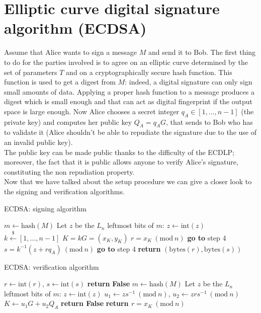 \bigskip

\section{Elliptic curve digital signature algorithm (ECDSA)}
\label{ecdsa}
Assume that Alice wants to sign a message $M$ and send it to Bob. The first thing to do for the parties involved is to agree on an elliptic curve determined by the set of parameters $T$ and on a cryptographically secure hash function. This function is used to get a digest from $M$: indeed, a digital signature can only sign small amounts of data. Applying a proper hash function to a message produces a digest which is small enough and that can act as digital fingerprint if the output space is large enough. Now Alice chooses a secret integer $q_A \in [1, ..., n - 1]$ (the private key) and computes her public key $Q_A = q_AG$, that sends to Bob who has to validate it (Alice shouldn't be able to repudiate the signature due to the use of an invalid public key). 
\\
The public key can be made public thanks to the difficulty of the ECDLP; moreover, the fact that it is public allows anyone to verify Alice's signature, constituting the non repudiation property.
\\
Now that we have talked about the setup procedure we can give a closer look to the signing and verification algorithms.

\bigskip

\begin{algorithm}
	\caption{ECDSA: signing algorithm}
	\label{alg:ecdsa_sig}
	\begin{algorithmic}[1]
		\State $m \gets \text{hash}(M)$
		\State Let $z$ be the $L_n$ leftmost bits of $m$: $z \gets \text{int}(z)$
		\State $k \xleftarrow{\text{\$}} [1, ..., n - 1]$
		\State $K = kG = (x_K, y_K)$
		\State $r = x_K \ (\text{mod} \ n)$
		\State \textbf{go to} step 4
		\EndIf 
		\State $s = k^{-1}(z + rq_A) \ (\text{mod} \ n)$
		\State \textbf{go to} step 4
		\EndIf
		\State \textbf{return} $(\text{bytes}(r), \text{bytes}(s))$
		\EndProcedure
	\end{algorithmic}
\end{algorithm}

\bigskip

\begin{algorithm}
	\caption{ECDSA: verification algorithm}
	\label{alg:ecdsa_ver}
	\begin{algorithmic}[1]
		\State $r \gets \text{int}(r)$, $s \gets \text{int}(s)$
		\State \textbf{return} {\bf False}
		\EndIf
		\State $m \gets \text{hash}(M)$
		\State Let $z$ be the $L_n$ leftmost bits of $m$: $z \gets \text{int}(z)$
		\State $u_1 \gets zs^{-1} \ (\text{mod} \ n)$, $u_2 \gets zrs^{-1} \ (\text{mod} \ n)$
		\State $K \gets u_1G + u_2Q_A$
		\State \textbf{return False} 
		\EndIf
		\State \textbf{return $r = x_K \ (\text{mod} \ n)$}
		\EndProcedure	
	\end{algorithmic}
\end{algorithm}

